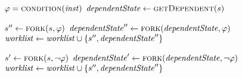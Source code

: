 \begin{algorithm}
\begin{algorithmic}[1]
    \label{alg:casebranch-begin}
       \label{alg:branch-check-recovery}
        \State $\varphi = \Call{condition}{\inst}$  \label{alg:branch-get-cond}
        \State $\dependentState \gets  \Call{getDependent}{\workstate}$ \label{alg:extract-dependent}

        \State $\workstate'' \gets \Call{fork}{\workstate,\varphi }$ \label{alg:branch-fork-true1}
        \State $\dependentState'' \gets \Call{fork}{\dependentState,\varphi }$ \label{alg:branch-fork-true2}
       \label{alg:branch-feasible-true}
           \State $\mathit{worklist}  \gets  \mathit{worklist}  \cup \{s'', \mathit{dependentState}''\}$
           \label{alg:push-worklist-true-branch}
      \EndIf

      \State $\workstate' \gets \Call{fork}{\workstate, \neg\varphi}$ \label{alg:branch-fork-false1}
      \State $\dependentState' \gets \Call{fork}{\dependentState, \neg\varphi}$ \label{alg:branch-fork-false2}
        \label{alg:branch-feasible-false}
           \State $\mathit{worklist}  \gets  \mathit{worklist}  \cup \{s'', \mathit{dependentState}''\}$
           \label{alg:push-worklist-false-branch}
      \EndIf



     \Else
        \State {}  \label{alg:branch-normal}
    \EndIf
   \EndCase \label{alg:casebranch-end}


\end{algorithmic}
\end{algorithm}
